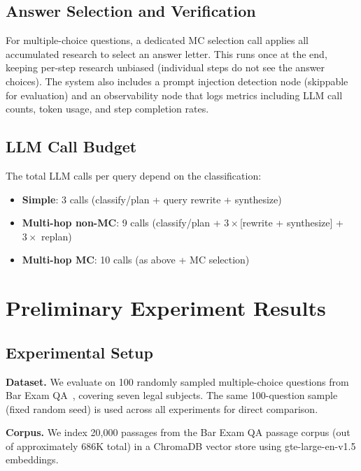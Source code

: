 \documentclass{article}
\begin{document}
\subsection{Answer Selection and Verification}

For multiple-choice questions, a dedicated MC selection call applies all accumulated research to select an answer letter. This runs once at the end, keeping per-step research unbiased (individual steps do not see the answer choices). The system also includes a prompt injection detection node (skippable for evaluation) and an observability node that logs metrics including LLM call counts, token usage, and step completion rates.

\subsection{LLM Call Budget}

The total LLM calls per query depend on the classification:
\begin{itemize}[leftmargin=*,nosep]
    \item \textbf{Simple}: 3 calls (classify/plan + query rewrite + synthesize)
    \item \textbf{Multi-hop non-MC}: 9 calls (classify/plan + $3\times$[rewrite + synthesize] + $3\times$ replan)
    \item \textbf{Multi-hop MC}: 10 calls (as above + MC selection)
\end{itemize}

\section{Preliminary Experiment Results}

\subsection{Experimental Setup}

\textbf{Dataset.} We evaluate on 100 randomly sampled multiple-choice questions from Bar Exam QA~\cite{barexamqa}, covering seven legal subjects. The same 100-question sample (fixed random seed) is used across all experiments for direct comparison.

\textbf{Corpus.} We index 20,000 passages from the Bar Exam QA passage corpus (out of approximately 686K total) in a ChromaDB vector store using gte-large-en-v1.5 embeddings.
\end{document}
